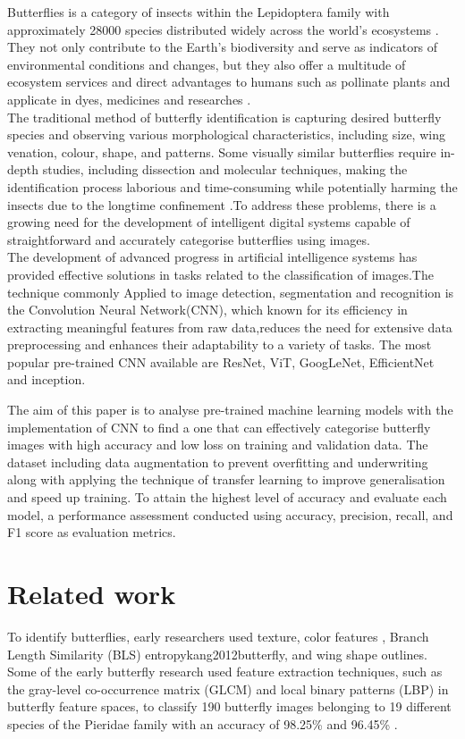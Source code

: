 \documentclass[10pt,twocolumn,letterpaper]{article}
\begin{document}
Butterflies is a category of insects within the Lepidoptera family with approximately 28000 species distributed widely across the world's ecosystems\cite{ghazanfar2016butterflies} . They not only contribute to the Earth's biodiversity and serve as indicators of environmental conditions and changes, but they also offer a multitude of ecosystem services and direct advantages to humans such as pollinate plants and applicate in dyes, medicines and researches \cite{wang2020butterfly}. \\
\indent The traditional method of butterfly identification is capturing desired butterfly species and observing various morphological characteristics, including size, wing venation, colour, shape, and patterns. Some visually similar butterflies require in-depth studies, including dissection and molecular techniques, making the identification process laborious and time-consuming while potentially harming the insects due to the longtime confinement \cite{xi2022multiple}.To address these problems, there is a growing need for the development of intelligent digital systems capable of straightforward and accurately categorise butterflies using images.
\\
\indent The development of advanced progress in artificial intelligence systems has provided effective solutions in tasks related to the classification of images.The technique commonly
Applied to image detection, segmentation and recognition is the Convolution Neural Network(CNN), which known for its efficiency in extracting meaningful features from raw data,reduces 
the need for extensive data preprocessing and enhances their adaptability to a variety of tasks. The most popular pre-trained CNN available are ResNet, ViT, GoogLeNet, EfficientNet and inception. 

\indent The aim of this paper is to analyse pre-trained machine learning models with the implementation of CNN to find a one that can effectively categorise butterfly images with high accuracy and low loss on training and validation data. The dataset including data augmentation to prevent overfitting and underwriting along with applying the technique of transfer learning to improve generalisation and speed up training. To attain the highest level of accuracy and evaluate each model, a performance assessment conducted using accuracy, precision, recall, and F1 score as evaluation metrics.

\section{Related work}
To identify butterflies, early researchers used texture\cite{kaya2015automatic}, color features \cite{kaya2015automatic}, Branch Length Similarity (BLS) entropy{kang2012butterfly}, and wing shape outlines\cite{kang2014identification}. Some of the early butterfly research used feature extraction techniques, such as the gray-level co-occurrence matrix (GLCM) and local binary patterns (LBP) in butterfly feature spaces, to classify 190 butterfly images belonging to 19 different species of the Pieridae family with an accuracy of 98.25\% and 96.45\% \cite{kaya2014evaluation}.\\
\end{document}
